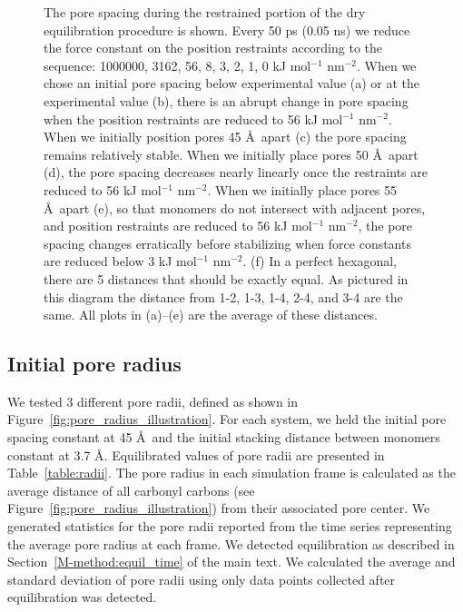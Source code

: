\documentclass{article}
\begin{document}
\begin{figure}[!htb]
	\caption{The pore spacing during the restrained portion of the
	dry equilibration procedure is shown. Every 50 ps (0.05 ns) we reduce the 
	force constant on the position restraints according to the sequence: 1000000,
	3162, 56, 8, 3, 2, 1, 0 kJ mol$^{-1}$ nm$^{-2}$. When we chose an initial pore
	spacing below experimental value (a) or at the experimental value (b), there
	is an abrupt change in pore spacing when the position restraints are reduced to 56 kJ
	mol$^{-1}$ nm$^{-2}$. When we initially position pores 45 \AA~apart (c) the pore spacing
	remains relatively stable. When we initially place pores 50 \AA~apart (d), the pore
	spacing decreases nearly linearly once the restraints are reduced to 56 kJ
	mol$^{-1}$ nm$^{-2}$. When we initially place pores 55 \AA~apart (e), so that monomers
	do not intersect with adjacent pores, and position restraints are reduced to 56
	kJ mol$^{-1}$ nm$^{-2}$, the pore spacing changes erratically before stabilizing
	when force constants are reduced below 3 kJ mol$^{-1}$ nm$^{-2}$. (f)
	In a perfect hexagonal, there are 5 distances that should be exactly
	equal. As pictured in this diagram the distance from 1-2, 1-3, 1-4, 2-4, and 3-4
	are the same. All plots in (a)--(e) are the average of these distances.} 
	\label{fig:p2p}
  \end{figure}

  \subsection{Initial pore radius}\label{section:initial_pore_radius}

  We tested 3 different pore radii, defined as shown in
  Figure~\ref{fig:pore_radius_illustration}. For each system, we held the initial
  pore spacing constant at 45 \AA~and the initial stacking distance between monomers
  constant at 3.7 \AA. Equilibrated values of pore radii are presented in
  Table~\ref{table:radii}. The pore radius in each simulation frame is calculated
  as the average distance of all carbonyl carbons (see
  Figure~\ref{fig:pore_radius_illustration}) from their associated pore center.
  We generated statistics for the pore radii reported from the time series
  representing the average pore radius at each frame. We detected equilibration
  as described in Section~\ref{M-method:equil_time} of the main text. We 
  calculated the average and standard deviation of pore radii using only data 
  points collected after equilibration was detected.
\end{document}
